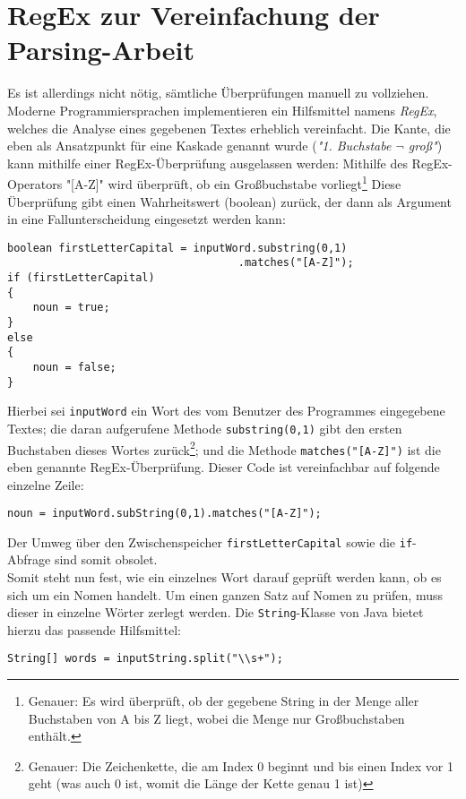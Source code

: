 \documentclass[12pt,twoside]{article}
\theoremstyle{plain}
\theoremstyle{definition}
\theoremstyle{remark}
\begin{document}
\section{RegEx zur Vereinfachung der Parsing-Arbeit}
\label{sec:regex}
Es ist allerdings nicht nötig, sämtliche Überprüfungen manuell zu vollziehen.
Moderne Programmiersprachen implementieren ein Hilfsmittel namens \textit{RegEx}, welches die Analyse eines gegebenen Textes erheblich vereinfacht.
Die Kante, die eben als Ansatzpunkt für eine Kaskade genannt wurde (\textit{"1. Buchstabe $\lnot$ groß"}) kann mithilfe einer RegEx-Überprüfung ausgelassen werden: Mithilfe des RegEx-Operators "[A-Z]" wird überprüft, ob ein Großbuchstabe vorliegt\footnote{Genauer: Es wird überprüft, ob der gegebene String in der Menge aller Buchstaben von A bis Z liegt, wobei die Menge nur Großbuchstaben enthält.}
Diese Überprüfung gibt einen Wahrheitswert (boolean) zurück, der dann als Argument in eine Fallunterscheidung eingesetzt werden kann:
\begin{lstlisting}[caption=Überprüfung des ersten Buchstabens (lang)]
boolean firstLetterCapital = inputWord.substring(0,1)
									.matches("[A-Z]");
if (firstLetterCapital)
{
	noun = true;
}
else
{
	noun = false;
}
\end{lstlisting}
Hierbei sei \texttt{inputWord} ein Wort des vom Benutzer des Programmes eingegebene Textes; die daran aufgerufene Methode \texttt{substring(0,1)} gibt den ersten Buchstaben dieses Wortes zurück\footnote{Genauer: Die Zeichenkette, die am Index 0 beginnt und bis einen Index vor 1 geht (was auch 0 ist, womit die Länge der Kette genau 1 ist)}; und die Methode \texttt{matches("[A-Z]")} ist die eben genannte RegEx-Überprüfung.
Dieser Code ist vereinfachbar auf folgende einzelne Zeile:
\begin{lstlisting}[caption=Überprüfung des ersten Buchstabens (kurz)]
noun = inputWord.subString(0,1).matches("[A-Z]");
\end{lstlisting}
Der Umweg über den Zwischenspeicher \texttt{firstLetterCapital} sowie die \texttt{if}-Abfrage sind somit obsolet.\\
Somit steht nun fest, wie ein einzelnes Wort darauf geprüft werden kann, ob es sich um ein Nomen handelt.
Um einen ganzen Satz auf Nomen zu prüfen, muss dieser in einzelne Wörter zerlegt werden.
Die \texttt{String}-Klasse von Java bietet hierzu das passende Hilfsmittel:
\begin{lstlisting}[caption=Teilen eines Strings jedem Vorkommen von einem oder mehr Leerzeichen]
String[] words = inputString.split("\\s+");
\end{lstlisting}
\end{document}

